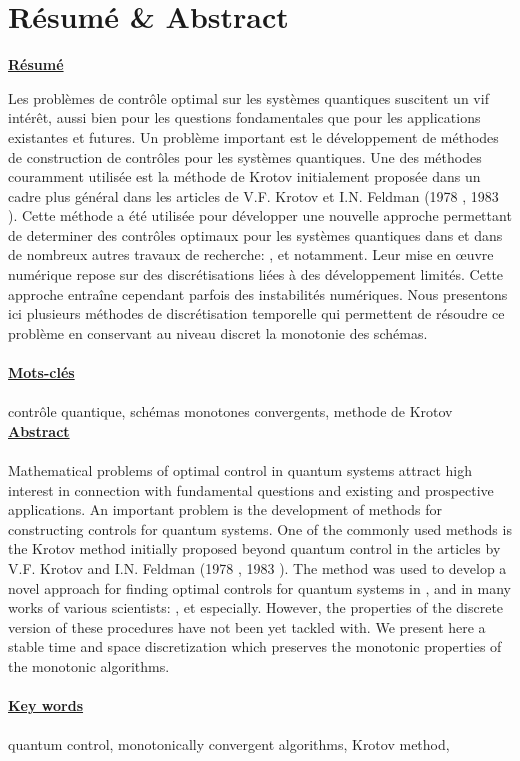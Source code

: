 \chapter*{Résumé \& Abstract}
\Large
\begin{flushleft}
\textbf{\underline{Résumé}}
\end{flushleft}
\normalsize
Les problèmes de contrôle optimal sur les systèmes quantiques suscitent un vif intérêt, aussi bien pour les questions fondamentales que pour les applications existantes et futures. Un problème important est le développement de méthodes de construction de contrôles pour les systèmes quantiques. Une des méthodes couramment utilisée est la méthode de Krotov initialement proposée dans un cadre plus général dans les articles de V.F. Krotov et I.N. Feldman (1978 \cite{Krotov1}, 1983 \cite{Krotov2}). Cette méthode a été utilisée pour développer une nouvelle approche permettant de determiner des contrôles optimaux pour les systèmes quantiques dans \cite{Tannor} et dans de nombreux autres travaux de recherche: \cite{Zhu}, \cite{Maday} et \cite{Salomon} notamment. Leur mise en œuvre numérique repose sur des discrétisations liées à des développement limités. Cette approche entraîne cependant parfois des instabilités numériques. Nous presentons ici plusieurs méthodes de discrétisation temporelle qui permettent de résoudre ce problème en conservant au niveau discret la monotonie des schémas.\\\\
\Large\textbf{\underline{Mots-clés}}\normalsize\\\\
contrôle quantique, schémas monotones convergents, methode de Krotov
\[\]
\Large\textbf{\underline{Abstract}}\\\\\normalsize
Mathematical problems of optimal control in quantum systems attract high interest in connection with fundamental questions and existing and prospective applications. An important problem is the development of methods for constructing controls for quantum systems. One of the commonly used methods is the Krotov method initially proposed beyond quantum control in the articles by V.F. Krotov and I.N. Feldman (1978 \cite{Krotov1}, 1983 \cite{Krotov2}). The method was used to develop a novel approach for finding optimal controls for quantum systems in \cite{Tannor}, and in many works of various scientists: \cite{Zhu}, \cite{Maday} et \cite{Salomon} especially. However, the properties of the discrete version of these procedures have not been yet tackled with.
We present here a stable time and space discretization which preserves the
monotonic properties of the monotonic algorithms.\\\\
\Large\textbf{\underline{Key words}}\normalsize\\\\
quantum control, monotonically convergent algorithms, Krotov method,
